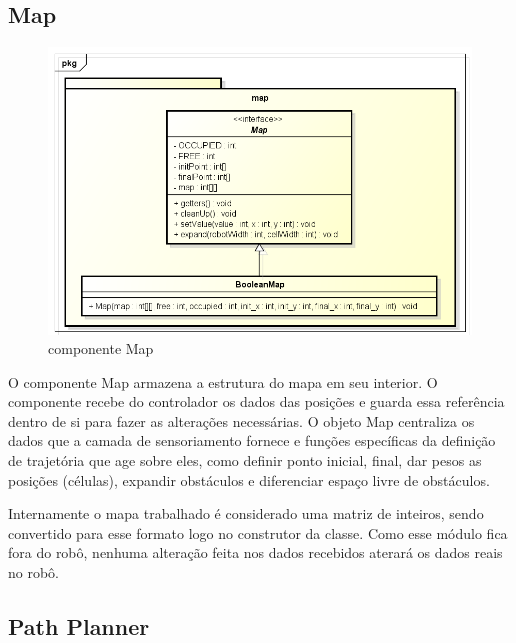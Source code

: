 \subsection{Map}

\begin{figure}[h]
	\centering
	\label{fig27}
		\includegraphics[keepaspectratio=true,scale=0.5]{figuras/pkgmap.png}
	\caption{componente Map}
\end{figure}

O componente Map armazena a estrutura do mapa em seu interior. O componente recebe do controlador os dados das posições e guarda essa referência dentro de si para fazer as alterações necessárias. O objeto Map centraliza os dados que a camada de sensoriamento fornece e funções específicas da definição de trajetória que age sobre eles, como definir ponto inicial, final, dar pesos as posições (células), expandir obstáculos e diferenciar espaço livre de obstáculos.

Internamente o mapa trabalhado é considerado uma matriz de inteiros, sendo convertido para esse formato logo no construtor da classe. Como esse módulo fica fora do robô, nenhuma alteração feita nos dados recebidos aterará os dados reais no robô.

\subsection{Path Planner}

